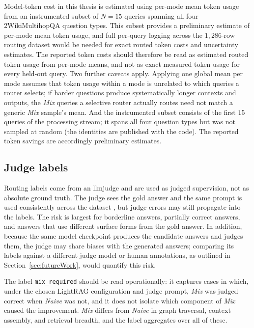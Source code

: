\documentclass[english, bibtex]{kththesis}               %
\numberwithin{listing}{chapter}
\begin{document}
Model-token cost in this thesis is estimated using per-mode mean token usage from an instrumented subset of \(N = 15\) queries spanning all four 2WikiMultihopQA question types. This subset provides a preliminary estimate of per-mode mean token usage, and full per-query logging across the $1{,}286$-row routing dataset would be needed for exact routed token costs and uncertainty estimates. The reported token costs should therefore be read as estimated routed token usage from per-mode means, and not as exact measured token usage for every held-out query. Two further caveats apply. Applying one global mean per mode assumes that token usage within a mode is unrelated to which queries a router selects; if harder questions produce systematically longer contexts and outputs, the \emph{Mix} queries a selective router actually routes need not match a generic \emph{Mix} sample's mean. And the instrumented subset consists of the first $15$ queries of the processing stream; it spans all four question types but was not sampled at random (the identities are published with the code). The reported token savings are accordingly preliminary estimates.

\subsection{Judge labels}
\label{sec:limitJudgeLabels}

Routing labels come from an \gls{llmjudge} and are used as judged supervision, not as absolute ground truth. The judge sees the gold answer and the same prompt is used consistently across the dataset \cite{zheng2023judge}, but judge errors may still propagate into the labels. The risk is largest for borderline answers, partially correct answers, and answers that use different surface forms from the gold answer. In addition, because the same model checkpoint produces the candidate answers and judges them, the judge may share biases with the generated answers; comparing its labels against a different judge model or human annotations, as outlined in Section~\ref{sec:futureWork}, would quantify this risk.

The label \texttt{mix\_required} should be read operationally: it captures cases in which, under the chosen LightRAG configuration and judge prompt, \emph{Mix} was judged correct when \emph{Naive} was not, and it does not isolate which component of \emph{Mix} caused the improvement. \emph{Mix} differs from \emph{Naive} in graph traversal, context assembly, and retrieval breadth, and the label aggregates over all of these.
\end{document}
